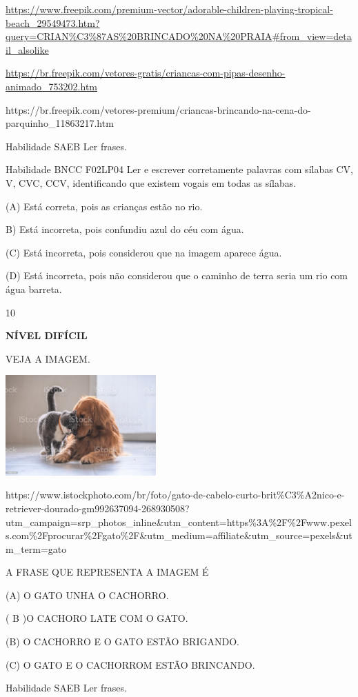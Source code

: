{{\url{https://www.freepik.com/premium-vector/adorable-children-playing-tropical-beach_29549473.htm?query=CRIAN\%C3\%87AS\%20BRINCADO\%20NA\%20PRAIA\#from_view=detail_alsolike}

\url{https://br.freepik.com/vetores-gratis/criancas-com-pipas-desenho-animado_753202.htm}

https://br.freepik.com/vetores-premium/criancas-brincando-na-cena-do-parquinho\_11863217.htm

Habilidade SAEB Ler frases.

Habilidade BNCC F02LP04 Ler e escrever corretamente palavras com sílabas
CV, V, CVC, CCV, identificando que existem vogais em todas as sílabas.

(A) Está correta, pois as crianças estão no rio.

B) Está incorreta, pois confundiu azul do céu com água.

(C) Está incorreta, pois considerou que na imagem aparece água.

(D) Está incorreta, pois não considerou que o caminho de terra seria um
rio com água barreta.

\num{10}

\textbf{NÍVEL DIFÍCIL}

VEJA A IMAGEM.

\includegraphics[width=2.27539in,height=1.51515in]{media/image158.jpeg}

https://www.istockphoto.com/br/foto/gato-de-cabelo-curto-brit\%C3\%A2nico-e-retriever-dourado-gm992637094-268930508?utm\_campaign=srp\_photos\_inline\&utm\_content=https\%3A\%2F\%2Fwww.pexels.com\%2Fprocurar\%2Fgato\%2F\&utm\_medium=affiliate\&utm\_source=pexels\&utm\_term=gato

A FRASE QUE REPRESENTA A IMAGEM É

(A) O GATO UNHA O CACHORRO.

( B )O CACHORO LATE COM O GATO.

(B) O CACHORRO E O GATO ESTÃO BRIGANDO.

(C) O GATO E O CACHORROM ESTÃO BRINCANDO.

\protect\hypertarget{_Hlk129376594}{}{}Habilidade SAEB Ler frases.

}}

